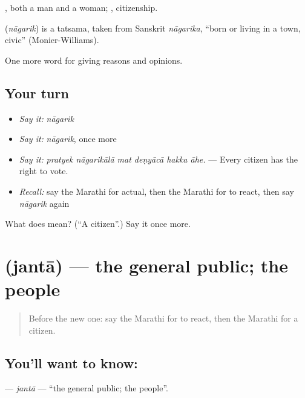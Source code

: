 , both a man and a woman; , citizenship.

\begin{cousinweb}
\textbf{} (\emph{nāgarik}) is a tatsama, taken from Sanskrit \emph{nāgarika}, \textquotedblleft{}born or living in a town, civic\textquotedblright{} (Monier-Williams).
\end{cousinweb}

\begin{grammarlens}[title={What you've built}]
One more word for giving reasons and opinions.
\end{grammarlens}

\subsection*{Your turn}
\begin{itemize}
\raggedright
  \item \emph{Say it:} \emph{nāgarik}
  \item \emph{Say it:} \emph{nāgarik}, once more
  \item \emph{Say it:} \emph{pratyek nāgarikālā mat deṇyācā hakka āhe.} — Every citizen has the right to vote.
  \item \emph{Recall:} say the Marathi for actual, then the Marathi for to react, then say \emph{nāgarik} again
\end{itemize}

\begin{tcolorbox}[breakable,colback=teal!4,colframe=teal!35!black,title={Before you move on}]
What does  mean? (\textquotedblleft{}A citizen\textquotedblright{}.) Say it once more.
\end{tcolorbox}
\section[\texorpdfstring{\mr{जनता} (jantā)}{जनता (jantā)}]{ (jantā) — the general public; the people}

\label{lesson:MR-C354-janta}



\begin{quote}
Before the new one: say the Marathi for to react, then the Marathi for a citizen.
\end{quote}

\subsection*{You'll want to know: }
\textbf{} — \emph{jantā} — \textquotedblleft{}the general public; the people\textquotedblright{}.

